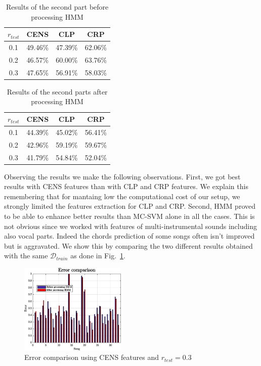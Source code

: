\begin{table}[h!]
	\caption{Results of the second part before processing HMM}
	\centering
	\begin{tabular}{|c |c c c|}
	\hline
	$r_{test}$ & CENS & CLP & CRP\\ \hline
	0.1 & 49.46\% & 47.39\% & 62.06\%\\
	0.2 & 46.57\% & 60.00\% & 63.76\%\\
	0.3 & 47.65\% & 56.91\% & 58.03\%\\
	\hline
	\end{tabular}
	\label{tab:resultbeforeHMM}
\end{table}

\begin{table}[h!]
	\caption{Results of the second parts after processing HMM}
	\centering
	\begin{tabular}{|c |c c c|}
	\hline
	$r_{test}$ & CENS & CLP & CRP\\ \hline
	0.1 & 44.39\% & 45.02\% & 56.41\%\\
	0.2 & 42.96\% & 59.19\% & 59.67\%\\
	0.3 & 41.79\% & 54.84\% & 52.04\%\\
	\hline
	\end{tabular}
	\label{tab:resultafterHMM}
\end{table}

 Observing the results we make the following observations. First, we got best results with CENS features than with CLP and CRP features. We explain this remembering that for mantaing low the computational cost of our setup, we strongly limited the features extraction for CLP and CRP. Second, HMM proved to be able to enhance better results than MC-SVM alone in all the cases. This is not obvious since we worked with features of multi-instrumental sounds including also vocal parts. Indeed the chords prediction of some songs often isn't improved but is aggravated. We show this by comparing the two different results obtained with the same $\mathcal{D}_{train}$ as done in Fig.~\ref{fig:compareerror}.

\begin{figure} [h!]
	\centering
	\includegraphics[width=0.45\textwidth]{img/Result_HMM/CENS/plot03071}
	\caption{Error comparison using CENS features and $r_{test}=0.3$}
	\label{fig:compareerror}
\end{figure}

